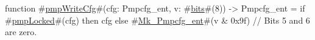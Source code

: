 function #\hyperref[sailRISCVzpmpWriteCfg]{pmpWriteCfg}#(cfg: Pmpcfg_ent, v: #\hyperref[sailRISCVzbits]{bits}#(8)) -> Pmpcfg_ent =
  if #\hyperref[sailRISCVzpmpLocked]{pmpLocked}#(cfg) then cfg
  else #\hyperref[sailRISCVzMkzyPmpcfgzyent]{Mk\_Pmpcfg\_ent}#(v & 0x9f)  // Bits 5 and 6 are zero.
